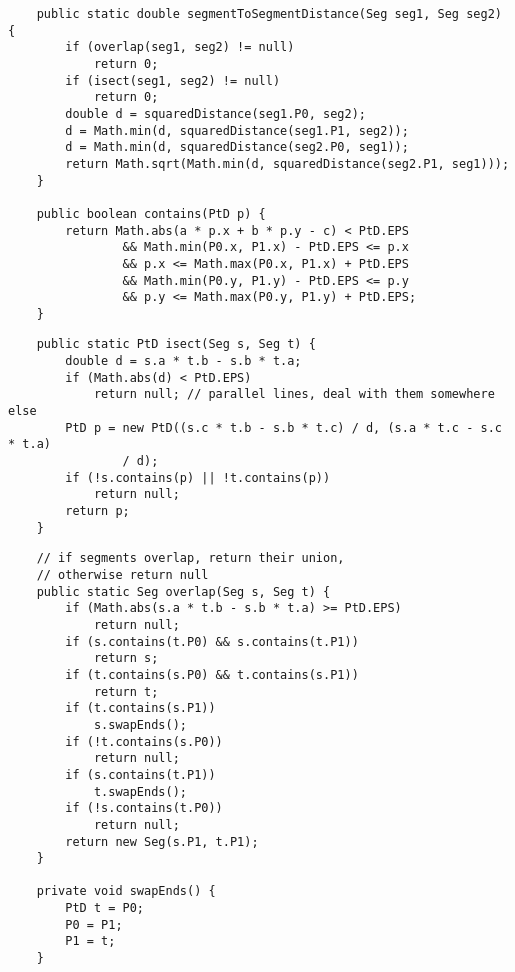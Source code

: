 \documentclass{article}
\begin{document}
    \begin{verbatim}
    public static double segmentToSegmentDistance(Seg seg1, Seg seg2) {
        if (overlap(seg1, seg2) != null)
            return 0;
        if (isect(seg1, seg2) != null)
            return 0;
        double d = squaredDistance(seg1.P0, seg2);
        d = Math.min(d, squaredDistance(seg1.P1, seg2));
        d = Math.min(d, squaredDistance(seg2.P0, seg1));
        return Math.sqrt(Math.min(d, squaredDistance(seg2.P1, seg1)));
    }

    public boolean contains(PtD p) {
        return Math.abs(a * p.x + b * p.y - c) < PtD.EPS
                && Math.min(P0.x, P1.x) - PtD.EPS <= p.x
                && p.x <= Math.max(P0.x, P1.x) + PtD.EPS
                && Math.min(P0.y, P1.y) - PtD.EPS <= p.y
                && p.y <= Math.max(P0.y, P1.y) + PtD.EPS;
    }

    \end{verbatim}
    \begin{verbatim}
    public static PtD isect(Seg s, Seg t) {
        double d = s.a * t.b - s.b * t.a;
        if (Math.abs(d) < PtD.EPS)
            return null; // parallel lines, deal with them somewhere else
        PtD p = new PtD((s.c * t.b - s.b * t.c) / d, (s.a * t.c - s.c * t.a)
                / d);
        if (!s.contains(p) || !t.contains(p))
            return null;
        return p;
    }

    \end{verbatim}
    \begin{verbatim}
    // if segments overlap, return their union,
    // otherwise return null
    public static Seg overlap(Seg s, Seg t) {
        if (Math.abs(s.a * t.b - s.b * t.a) >= PtD.EPS)
            return null;
        if (s.contains(t.P0) && s.contains(t.P1))
            return s;
        if (t.contains(s.P0) && t.contains(s.P1))
            return t;
        if (t.contains(s.P1))
            s.swapEnds();
        if (!t.contains(s.P0))
            return null;
        if (s.contains(t.P1))
            t.swapEnds();
        if (!s.contains(t.P0))
            return null;
        return new Seg(s.P1, t.P1);
    }

    private void swapEnds() {
        PtD t = P0;
        P0 = P1;
        P1 = t;
    }

    \end{verbatim}
\end{document}
